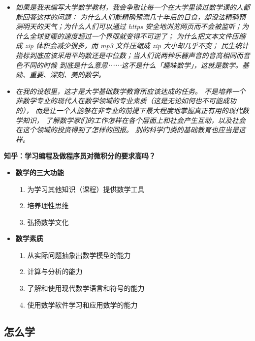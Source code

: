 \begin{shaded}
\begin{itemize}
{	  和定理开始堆砌，直到超出教材所可能涵盖的水平为止}
	  \item {\it 如果是我来编写大学数学教材，我会争取让每一个在大学里读过数学课的人都能回答这样的问题：
	  为什么人们能精确预测几十年后的日食，却没法精确预测明天的天气；为什么人们可以通过 https 
	  安全地浏览网页而不会被监听；为什么全球变暖的速度超过一个界限就变得不可逆了；
	  为什么把文本文件压缩成 zip 体积会减少很多，而 mp3 文件压缩成 zip 大小却几乎不变；
	  民生统计指标到底应该采用平均数还是中位数；当人们说两种乐器声音的音高相同而音色不同的时候
	  到底是什么意思⋯⋯这不是什么「趣味数学」，这就是数学。基础、重要、深刻、美的数学。}
	  \item {\it 在我的设想里，这才是大学基础数学教育所应该达成的任务。
	  不是培养一个非数学专业的现代人在数学领域的专业素质（这是无论如何也不可能成功的），
	  而是让一个人能够在非专业的前提下最大程度地掌握真正有用的现代数学知识，
	  了解数学家们的工作怎样在各个层面上和社会产生互动，以及社会在这个领域的投资得到了怎样的回报。
	  别的科学门类的基础教育也应当是这样。}
	\end{itemize}
	{\bf 知乎：学习编程及做程序员对微积分的要求高吗？}
\end{shaded}

\begin{itemize}
  \item {\bf 数学的三大功能}
  \begin{enumerate}
    \item 为学习其他知识（课程）提供数学工具
    \item 培养理性思维
    \item 弘扬数学文化
  \end{enumerate}
  \item {\bf 数学素质}
  \begin{enumerate}
    \item 从实际问题抽象出数学模型的能力
    \item 计算与分析的能力
    \item 了解和使用现代数学语言和符号的能力
    \item 使用数学软件学习和应用数学的能力
  \end{enumerate}
\end{itemize}

\subsection{怎么学}

